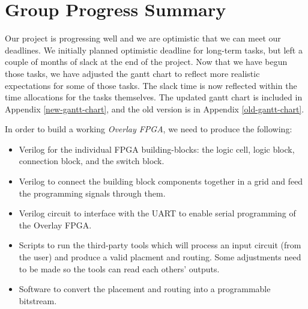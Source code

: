 \section{Group Progress Summary}

%
%
%


Our project is progressing well and we are optimistic that we can meet our deadlines.
We initially planned optimistic deadline for long-term tasks, but left a couple of months of slack at the end of the project.
Now that we have begun those tasks, we have adjusted the gantt chart to reflect more realistic expectations for some of those tasks.
The slack time is now reflected within the time allocations for the tasks themselves.
The updated gantt chart is included in Appendix \ref{new-gantt-chart}, and the old version is in Appendix \ref{old-gantt-chart}.

In order to build a working \emph{Overlay FPGA}, we need to produce the following:
\begin{itemize}
\item Verilog for the individual FPGA building-blocks: the logic cell, logic block, connection block, and the switch block.
\item Verilog to connect the building block components together in a grid and feed the programming signals through them.
\item Verilog circuit to interface with the UART to enable serial programming of the Overlay FPGA.
\item Scripts to run the third-party tools which will process an input circuit (from the user) and produce a valid placment and routing. Some adjustments need to be made so the tools can read each others' outputs.
\item Software to convert the placement and routing into a programmable bitstream.
\end{itemize}


